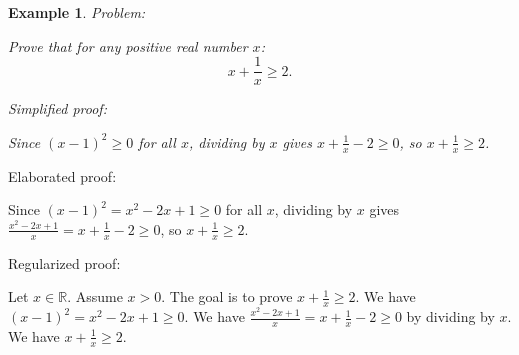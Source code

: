 \documentclass{article}
\newtheorem{example}{Example}
\begin{document}
\begin{tcolorbox}[colback=white!10, width=\linewidth]
\begin{lstlisting}[language=Lean4]
\end{lstlisting}
\end{tcolorbox}


\begin{example}
Problem:
\begin{tcolorbox}[colback=yellow!10, width=\linewidth]
Prove that for any positive real number $x$:
    $$x + \frac{1}{x} \geq 2.$$
\end{tcolorbox}

Simplified proof:
\begin{tcolorbox}[colback=blue!10, width=\linewidth]
Since $(x-1)^2 \ge 0$ for all $x$, dividing by $x$ gives $x + \frac{1}{x} - 2 \ge 0$, so $x + \frac{1}{x} \ge 2$.
\end{tcolorbox}
\end{example}

Elaborated proof:
\begin{tcolorbox}[colback=green!10, width=\linewidth]
Since $(x-1)^2 = x^2 - 2x + 1 \ge 0$ for all $x$, dividing by $x$ gives $\frac{x^2 - 2x + 1}{x} = x + \frac{1}{x} - 2 \ge 0$, so $x + \frac{1}{x} \ge 2$.
\end{tcolorbox}

Regularized proof:
\begin{tcolorbox}[colback=red!10, width=\linewidth]
Let $x\in\mathbb{R}$. Assume $x>0$.
The goal is to prove $x + \frac{1}{x} \ge 2$.
We have ${\left(x-1\right)}^2 = x^2 - 2x + 1 \ge 0$.
We have $\frac{x^2 - 2x + 1}{x} = x + \frac{1}{x} - 2 \ge 0$ by dividing by $x$.
We have $x + \frac{1}{x} \ge 2$.
\end{tcolorbox}
\end{document}
